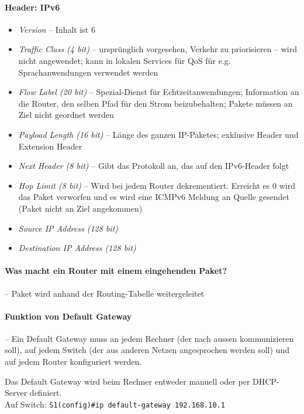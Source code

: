 \documentclass[a4paper,12pt]{article}
\begin{document}
\paragraph{Header: IPv6}
\begin{itemize}
\item \emph{Version} -- Inhalt ist 6
\item \emph{Traffic Class (4 bit)} -- ursprünglich vorgesehen, Verkehr zu priorisieren -- wird nicht angewendet; kann in lokalen Services für QoS für e.g. Sprachanwendungen verwendet werden
\item \emph{Flow Label (20 bit)} -- Spezial-Dienst für Echtzeitanwendungen; Information an die Router, den selben Pfad für den Strom beizubehalten; Pakete müssen an Ziel nicht geordnet werden
\item \emph{Payload Length (16 bit)} -- Länge des ganzen IP-Paketes; exklusive Header und Extension Header
\item \emph{Next Header (8 bit)} -- Gibt das Protokoll an, das auf den IPv6-Header folgt
\item \emph{Hop Limit (8 bit)} -- Wird bei jedem Router dekrementiert. Erreicht es $0$ wird das Paket verworfen und es wird eine ICMPv6 Meldung an Quelle gesendet (Paket nicht an Ziel angekommen)
\item \emph{Source IP Address (128 bit)}
\item \emph{Destination IP Address (128 bit)}
\end{itemize}


\paragraph{Was macht ein Router mit einem eingehenden Paket?} -- Paket wird anhand der Routing-Tabelle weitergeleitet



\paragraph{Funktion von Default Gateway} -- Ein Default Gateway muss an jedem Rechner (der nach aussen kommunizieren soll), auf jedem Switch (der aus anderen Netzen angesprochen werden soll) und auf jedem Router konfiguriert werden.

Das Default Gateway wird beim Rechner entweder manuell oder per DHCP-Server definiert.\\Auf Switch: \verb+S1(config)#ip default-gateway 192.168.10.1+
\end{document}

